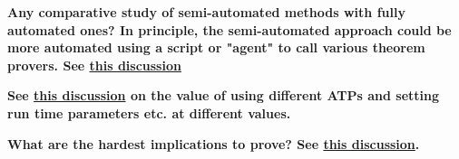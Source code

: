 
{\bf Any comparative study of semi-automated methods with fully automated ones? In principle, the semi-automated approach could be more automated using a script or "agent" to call various theorem provers. See \href{https://leanprover.zulipchat.com/#narrow/stream/458659-Equational/topic/A.20magma.20of.20order.20.3C.2013.20-.20for.20Equation2531.3F}{this discussion}}


{\bf See \href{https://leanprover.zulipchat.com/#narrow/channel/458659-Equational/topic/1516.20-.3E.20255/near/481547543}{this discussion} on the value of using different ATPs and setting run time parameters etc. at different values.}

{\bf What are the hardest implications to prove?  See \href{https://leanprover.zulipchat.com/#narrow/channel/458659-Equational/topic/What.20are.20the.20hardest.20positive.20implications.20for.20an.20ATP.3F}{this discussion}.}
